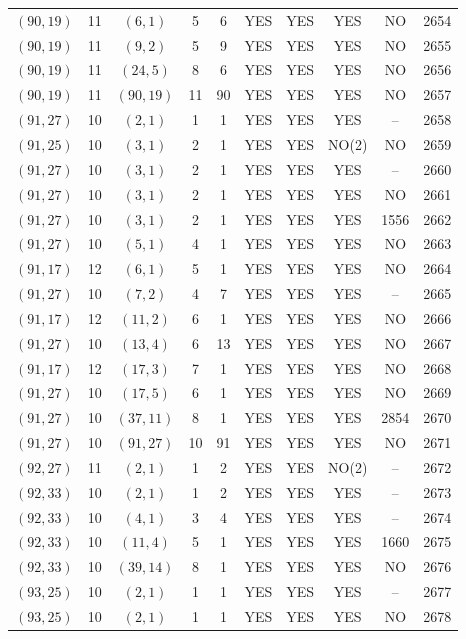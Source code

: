 \begin{longtable}{|c|c|c|c|c|c|c|c|c|c|}
$(90, 19)$ & 11 & $(6, 1)$ & 5 & 6 & YES & YES & YES & NO & 2654\\
$(90, 19)$ & 11 & $(9, 2)$ & 5 & 9 & YES & YES & YES & NO & 2655\\
$(90, 19)$ & 11 & $(24, 5)$ & 8 & 6 & YES & YES & YES & NO & 2656\\
$(90, 19)$ & 11 & $(90, 19)$ & 11 & 90 & YES & YES & YES & NO & 2657\\
$(91, 27)$ & 10 & $(2, 1)$ & 1 & 1 & YES & YES & YES & -- & 2658\\
$(91, 25)$ & 10 & $(3, 1)$ & 2 & 1 & YES & YES & NO(2) & NO & 2659\\
$(91, 27)$ & 10 & $(3, 1)$ & 2 & 1 & YES & YES & YES & -- & 2660\\
$(91, 27)$ & 10 & $(3, 1)$ & 2 & 1 & YES & YES & YES & NO & 2661\\
$(91, 27)$ & 10 & $(3, 1)$ & 2 & 1 & YES & YES & YES & 1556 & 2662\\
$(91, 27)$ & 10 & $(5, 1)$ & 4 & 1 & YES & YES & YES & NO & 2663\\
$(91, 17)$ & 12 & $(6, 1)$ & 5 & 1 & YES & YES & YES & NO & 2664\\
$(91, 27)$ & 10 & $(7, 2)$ & 4 & 7 & YES & YES & YES & -- & 2665\\
$(91, 17)$ & 12 & $(11, 2)$ & 6 & 1 & YES & YES & YES & NO & 2666\\
$(91, 27)$ & 10 & $(13, 4)$ & 6 & 13 & YES & YES & YES & NO & 2667\\
$(91, 17)$ & 12 & $(17, 3)$ & 7 & 1 & YES & YES & YES & NO & 2668\\
$(91, 27)$ & 10 & $(17, 5)$ & 6 & 1 & YES & YES & YES & NO & 2669\\
$(91, 27)$ & 10 & $(37, 11)$ & 8 & 1 & YES & YES & YES & 2854 & 2670\\
$(91, 27)$ & 10 & $(91, 27)$ & 10 & 91 & YES & YES & YES & NO & 2671\\
$(92, 27)$ & 11 & $(2, 1)$ & 1 & 2 & YES & YES & NO(2) & -- & 2672\\
$(92, 33)$ & 10 & $(2, 1)$ & 1 & 2 & YES & YES & YES & -- & 2673\\
$(92, 33)$ & 10 & $(4, 1)$ & 3 & 4 & YES & YES & YES & -- & 2674\\
$(92, 33)$ & 10 & $(11, 4)$ & 5 & 1 & YES & YES & YES & 1660 & 2675\\
$(92, 33)$ & 10 & $(39, 14)$ & 8 & 1 & YES & YES & YES & NO & 2676\\
$(93, 25)$ & 10 & $(2, 1)$ & 1 & 1 & YES & YES & YES & -- & 2677\\
$(93, 25)$ & 10 & $(2, 1)$ & 1 & 1 & YES & YES & YES & NO & 2678\\

\end{longtable}
